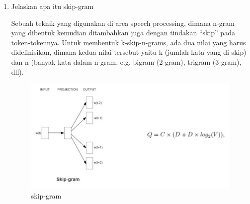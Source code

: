 \begin{enumerate}
			\item Jelaskan apa itu skip-gram
			\par Sebuah teknik yang digunakan di area speech processing, dimana n-gram yang dibentuk kemudian ditambahkan juga dengan tindakan “skip” pada token-tokennya. Untuk membentuk k-skip-n-grams, ada dua nilai yang harus dideﬁnisikan, dimana kedua nilai tersebut yaitu k (jumlah kata yang di-skip) dan n (banyak kata dalam n-gram, e.g. bigram (2-gram), trigram (3-gram), dll).
			\begin{figure}[H]
				\centering
				\includegraphics[scale=0.4]{figures/1174057/chapter5/6.png}
				\caption{skip-gram}
				\label{skip-gram}
			\end{figure}		

   		\end{enumerate}

